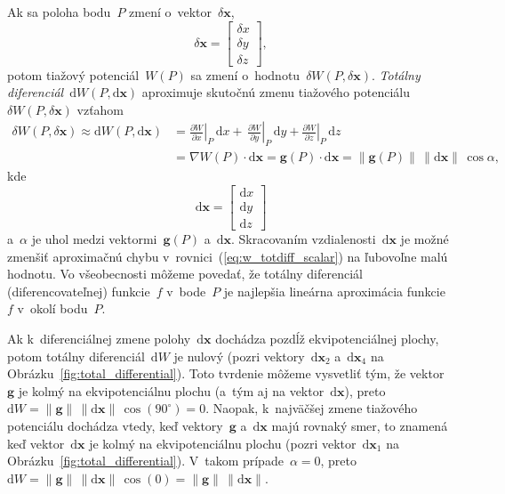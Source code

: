 \documentclass[a4paper, 12pt]{book}
\newcommand{\diff}{\mathrm d}
\let\vec\mathbf
\begin{document}
Ak sa poloha bodu~$P$ zmení o~vektor~$\delta \vec x$,
%
\begin{equation}
\label{eq:deltax}
\delta \vec x =
\begin{bmatrix}
\delta x\\
\delta y\\
\delta z
\end{bmatrix}
{,}
\end{equation}
%
potom tiažový potenciál~$W(P)$ sa zmení o~hodnotu~$\delta W(P, \delta \vec x)$.  
\emph{Totálny diferenciál}~$\diff W(P, \diff \vec x)$ aproximuje skutočnú zmenu 
tiažového potenciálu~$\delta W(P, \delta \vec x)$ vzťahom
%
\begin{equation}
\label{eq:w_totdiff_scalar}
\begin{split}
\delta W(P, \delta \vec x) \approx \diff W(P, \diff \vec x) &= 
\left.\frac{\partial W}{\partial x}\right|_P \, \diff x + \, 
\left.\frac{\partial W}{\partial y}\right|_P \, \diff y + \left.\frac{\partial 
W}{\partial z}\right|_P \, \diff z\\
%
&= \nabla W(P) \cdot \diff \vec x = \vec g(P) \cdot \diff \vec x = \| \vec g(P) 
\| \, \| \diff \vec x \| \, \cos\alpha{,}
\end{split}
\end{equation}
%
kde
%
\begin{equation}
\label{eq:diffx}
\diff \vec x =
\begin{bmatrix}
\diff x\\
\diff y\\
\diff z
\end{bmatrix}
\end{equation}
%
a~$\alpha$ je uhol medzi vektormi~$\vec g(P)$ a~$\diff \vec x$.  Skracovaním 
vzdialenosti~$\diff \vec x$ je možné zmenšiť aproximačnú chybu 
v~rovnici~(\ref{eq:w_totdiff_scalar}) na ľubovoľne malú hodnotu.  Vo 
všeobecnosti môžeme povedať, že totálny diferenciál (diferencovateľnej) 
funkcie~$f$ v~bode~$P$ je najlepšia lineárna aproximácia funkcie~$f$ v~okolí 
bodu~$P$.

Ak k~diferenciálnej zmene polohy~$\diff \vec x$ dochádza pozdĺž 
ekvipotenciálnej plochy, potom totálny diferenciál~$\diff W$ je nulový (pozri 
vektory~$\diff \vec x_2$ a~$\diff \vec x_4$ na 
Obrázku~\ref{fig:total_differential}).  Toto tvrdenie môžeme vysvetliť tým, že 
vektor~$\vec g$ je kolmý na ekvipotenciálnu plochu (a~tým aj na vektor~$\diff 
\vec x$), preto $\diff W = \| \vec g \| \, \| \diff \vec x \| \, 
\cos(90^{\circ}) = 0$.  Naopak, k~najväčšej zmene tiažového potenciálu dochádza 
vtedy, keď vektory~$\vec g$ a~$\diff \vec x$ majú rovnaký smer, to znamená keď 
vektor~$\diff \vec x$ je kolmý na ekvipotenciálnu plochu (pozri vektor~$\diff 
\vec x_1$ na Obrázku~\ref{fig:total_differential}).  V~takom prípade~$\alpha 
= 0$, preto $\diff W = \| \vec g \| \, \| \diff \vec x \| \, \cos(0) = \| \vec 
g \| \, \| \diff \vec x \|$.
\end{document}
